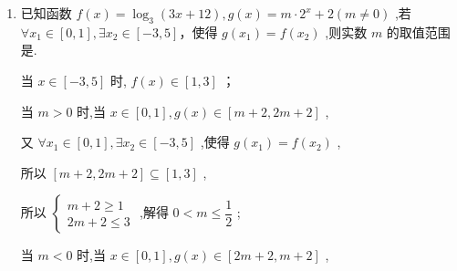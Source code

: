 \begin{enumerate}
\begin{jieda}
        因此 $\dfrac{4}{{x}_{4} + 1} + \left( {{x}_{1} + {x}_{2} + 2}\right) {x}_{3} = \dfrac{4}{{x}_{4} + 1} + 2{x}_{3} = \dfrac{4}{{x}_{4} + 1} + \dfrac{2}{{x}_{4} - 1} + 2$ ,
        
        令 $g\left( x\right)  = \dfrac{4}{x + 1} + \dfrac{2}{x - 1} + 2$ ,显然函数 $g\left( x\right)$ 在 $(2,3\rbrack$ 上递减,且 $g\left( 2\right)  = \dfrac{16}{3},g\left( 3\right)  = 4$ ,于是
        
        $g\left( x\right)  \in  \left\lbrack  {4,\dfrac{16}{3}}\right) ,$
        
        所以 $\dfrac{4}{{x}_{4} + 1} + \left( {{x}_{1} + {x}_{2} + 2}\right) {x}_{3}$ 的取值范围是 $\left\lbrack  {4,\dfrac{16}{3}}\right)$ .
    \end{jieda}
    
    \item 已知函数 $f\left( x\right)  = {\log }_{3}\left( {{3x} + {12}}\right) ,g\left( x\right)  = m \cdot  {2}^{x} + 2\left( {m \neq  0}\right)$ ,若 $\forall {x}_{1} \in  \left\lbrack  {0,1}\right\rbrack  ,\exists {x}_{2} \in  \left\lbrack  {-3,5}\right\rbrack$，使得 $g\left( {x}_{1}\right)  = f\left( {x}_{2}\right)$ ,则实数 $m$ 的取值范围是.
    \begin{jieda}
        当 $x \in  \left\lbrack  {-3,5}\right\rbrack$ 时, $f\left( x\right)  \in  \left\lbrack  {1,3}\right\rbrack$ ；
        
        当 $m > 0$ 时,当 $x \in  \left\lbrack  {0,1}\right\rbrack  ,g\left( x\right)  \in  \left\lbrack  {m + 2,{2m} + 2}\right\rbrack$ ,
        
        又 $\forall {x}_{1} \in  \left\lbrack  {0,1}\right\rbrack  ,\exists {x}_{2} \in  \left\lbrack  {-3,5}\right\rbrack$ ,使得 $g\left( {x}_{1}\right)  = f\left( {x}_{2}\right)$ ,
        
        所以 $\left\lbrack  {m + 2,{2m} + 2}\right\rbrack   \subseteq  \left\lbrack  {1,3}\right\rbrack$ ,
        
        所以 $\left\{  \begin{array}{l} m + 2 \geq  1 \\  {2m} + 2 \leq  3 \end{array}\right.$ ,解得 $0 < m \leq  \dfrac{1}{2}$ ;
        
        当 $m < 0$ 时,当 $x \in  \left\lbrack  {0,1}\right\rbrack  ,g\left( x\right)  \in  \left\lbrack  {{2m} + 2,m + 2}\right\rbrack$ ,
        

\end{jieda}
\end{enumerate}
